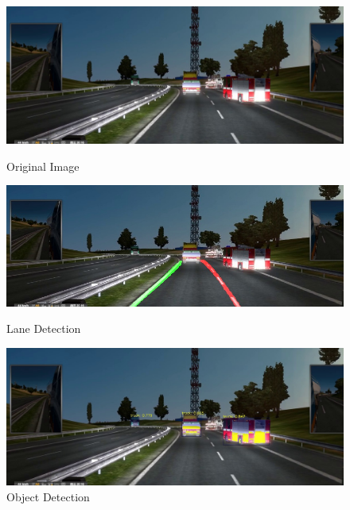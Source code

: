 \documentclass[runningheads]{llncs}
\begin{document}
\begin{figure}[!htb]
	\includegraphics[width=\linewidth]{result/w000139.jpg}
	\caption{Original Image}\label{fig:Original_Image}
	\endminipage\hfill
	\includegraphics[width=\linewidth]{result/w000139-lane.jpg}
	\caption{Lane Detection}\label{fig:Lane_Line_Result}
	\endminipage\hfill
	\includegraphics[width=\linewidth]{result/w000139-obj.jpg}
	\caption{Object Detection}\label{fig:Object_result}
	\endminipage
\end{figure}
\clearpage




\end{document}
